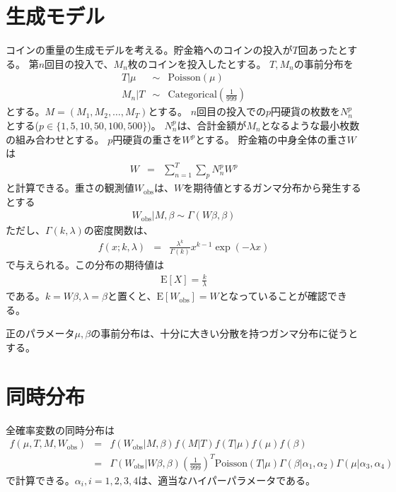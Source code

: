 \documentclass{jsarticle}
\newcommand{\numput}{T}
\newcommand{\maisu}{M}
\newcommand{\poisson}{\mathrm{Poisson}}
\newcommand{\categorical}{\mathrm{Categorical}}
\newcommand{\meannumput}{\mu}
\newcommand{\ncoins}[1]{N^{#1}}
\newcommand{\weight}[1]{W^{#1}}
\newcommand{\weightall}{W}
\newcommand{\ampeq}{&=&}
\newcommand{\weightobs}{W_{\mathrm{obs}}}
\newcommand{\expectation}{\mathrm{E}}
\newcommand{\weightvar}{\beta}
\begin{document}
\section{生成モデル}
コインの重量の生成モデルを考える。貯金箱へのコインの投入が$\numput$回あったとする。
第$n$回目の投入で、$\maisu_{n}$枚のコインを投入したとする。
$\numput, \maisu_{n}$の事前分布を
\begin{eqnarray*}
 \numput | \meannumput &\sim& \poisson(\meannumput) \\
 \maisu_{n} | \numput &\sim& \categorical\left(\frac{1}{999}\right)
\end{eqnarray*}
とする。$\maisu = (\maisu_{1}, \maisu_{2}, \ldots, \maisu_{\numput})$とする。
$n$回目の投入での$p$円硬貨の枚数を$\ncoins{p}_{n}$とする($p\in\{1,5,10,50,100,500\}$)。
$\ncoins{p}_{n}$は、合計金額が$\maisu_{n}$となるような最小枚数の組み合わせとする。
$p$円硬貨の重さを$\weight{p}$とする。
貯金箱の中身全体の重さ$\weightall$は
\begin{eqnarray*}
 \weightall \ampeq \sum_{n=1}^{\numput} \sum_{p} \ncoins{p}_{n} \weight{p}
\end{eqnarray*}
と計算できる。重さの観測値$\weightobs$は、$\weightall$を期待値とするガンマ分布から発生するとする
\begin{eqnarray*}
 \weightobs | \maisu, \weightvar \sim \Gamma(\weightall \weightvar, \weightvar)
\end{eqnarray*}
ただし、$\Gamma(k, \lambda)$の密度関数は、
\begin{eqnarray*}
 f(x; k, \lambda) \ampeq \frac{\lambda^{k}}{\Gamma(k)}x^{k-1}\exp(-\lambda x)
\end{eqnarray*}
で与えられる。この分布の期待値は
\begin{eqnarray*}
 \expectation [X] = \frac{k}{\lambda}
\end{eqnarray*}
である。$k=\weightall \weightvar, \lambda=\weightvar$と置くと、$\expectation[\weightobs] = \weightall$となっていることが確認できる。

正のパラメータ$\meannumput, \weightvar$の事前分布は、十分に大きい分散を持つガンマ分布に従うとする。

\section{同時分布}
全確率変数の同時分布は
\begin{eqnarray*}
 f(\meannumput, \numput, \maisu, \weightobs) \ampeq f(\weightobs | \maisu, \weightvar)f(\maisu | \numput)f(\numput | \meannumput)f(\meannumput)f(\weightvar) \\
  \ampeq \Gamma(\weightobs | \weightall \weightvar, \weightvar) \left(\frac{1}{999}\right)^{\numput} \poisson(T | \meannumput) \Gamma(\weightvar | \alpha_{1}, \alpha_{2}) \Gamma(\meannumput | \alpha_{3}, \alpha_{4})
\end{eqnarray*}
で計算できる。$\alpha_{i}, i=1,2,3,4$は、適当なハイパーパラメータである。
\end{document}
